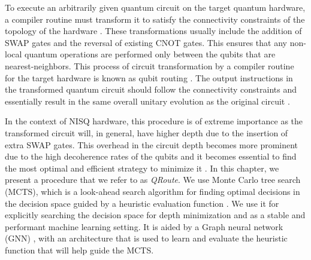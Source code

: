 To execute an arbitrarily given quantum circuit on the target quantum hardware, a compiler routine must transform it to satisfy the connectivity constraints of the topology of the hardware \cite{qroute_tket}. These transformations usually include the addition of SWAP gates and the reversal of existing CNOT gates. This ensures that any non-local quantum operations are performed only between the qubits that are nearest-neighbors. This process of circuit transformation by a compiler routine for the target hardware is known as qubit routing \cite{qroute_tket}. The output instructions in the transformed quantum circuit should follow the connectivity constraints and essentially result in the same overall unitary evolution as the original circuit \cite{qroute_dqn2}.

In the context of NISQ hardware, this procedure is of extreme importance as the transformed circuit will, in general, have higher depth due to the insertion of extra SWAP gates. This overhead in the circuit depth becomes more prominent due to the high decoherence rates of the qubits and it becomes essential to find the most optimal and efficient strategy to minimize it \cite{qroute_tket, qroute_dqn1, qroute_dqn2}. In this chapter, we present a procedure that we refer to as \textit{QRoute}. We use Monte Carlo tree search (MCTS), which is a look-ahead search algorithm for finding optimal decisions in the decision space guided by a heuristic evaluation function \cite{mcts_bandit_1, mcts_bandit_2, mcts_uct}. We use it for explicitly searching the decision space for depth minimization and as a stable and performant machine learning setting. It is aided by a Graph neural network (GNN) \cite{nn_edge_conv}, with an architecture that is used to learn and evaluate the heuristic function that will help guide the MCTS.


